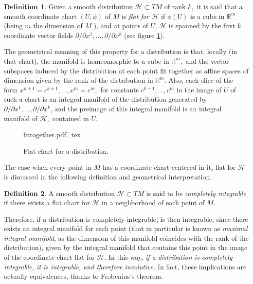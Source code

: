 \documentclass[12pt, letterpaper, reqno]{amsart}
\newcommand{\incfig}[2][1]{%
    \def\svgwidth{#1\columnwidth}
    {#2.pdf_tex}
}
\theoremstyle{definition}
\newtheorem{df}{Definition}
\theoremstyle{plain}
\theoremstyle{remark}
\begin{document}
\begin{df}
	Given a smooth distribution $ \mathcal{H}\subset TM $  of rank $ k, $ it is said that a smooth coordinate chart $ (U,\phi) $ of $ M $ is \textit{flat for $ \mathcal{H} $ } if $ \phi(U) $ is a cube in $ \mathbb{R}^m  $ (being $ m $ the dimension of $ M $ ), and at points of $ U $, $ \mathcal{H} $ is spanned by the first $ k $ coordinate vector fields $ \partial/\partial x^1,\dots,\partial/\partial x^k $ (see figure \ref{fig:fittogether}).
\end{df}
The geometrical meaning of this property for a distribution is that, locally (in that chart), the manifold is homeomorphic to a cube in $ \mathbb{R}^m,  $ and the vector subspaces induced by the distribution at each point fit together as affine spaces of dimension given by the rank of the distribution in $ \mathbb{R}^m $. Also, each slice of the form $ x^{k+1}=c^{k+1},\dots, x^m=c^m,$ for constants $ c^{k+1}, \dots, c^m $ in the image of $ U $ of such a chart is an integral manifold of the distribution generated by $ \partial/\partial x^1,\dots,\partial/\partial x^k $, and the preimage of this integral manifold is an integral manifold of $ \mathcal{H}, $ contained in $ U. $  

\begin{figure}
    \centering
    \incfig{fittogether}
    \caption{Flat chart for a distribution.}
    \label{fig:fittogether}
\end{figure}

The case when every point in $ M $ has a coordinate chart centered in it, flat for $ \mathcal{H} $ is discussed in the following definition and geometrical interpretation.

\begin{df}
	A smooth distribution $ \mathcal{H}\subset TM $  is said to be \textit{completely integrable} if there exists a flat chart for $ \mathcal{H} $ in a neighborhood of each point of $ M. $ 
\end{df}

Therefore, if a distribution is completely integrable, is then integrable, since there exists an integral manifold for each point (that in particular is known as \textit{maximal integral manifold}, as the dimension of this manifold coincides with the rank of the distribution), given by the integral manifold that contains this point in the image of the coordinate chart flat for $ \mathcal{H}. $ In this way, \textit{ if a distribution is completely integrable, it is integrable, and therefore involutive.} In fact, these implications are actually equivalences, thanks to Frobenius's theorem.
\end{document}

